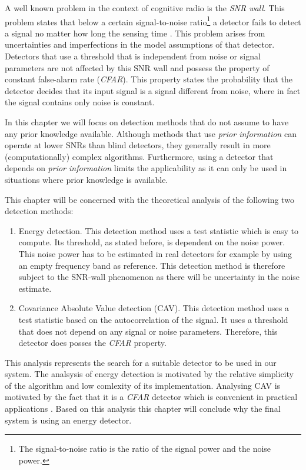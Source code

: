 \documentclass[a4paper, openany, oneside]{memoir}
\begin{document}
A well known problem in the context of cognitive radio is the \emph{SNR wall}. This problem states that below a certain signal-to-noise ratio\footnote{The signal-to-noise ratio is the ratio of the signal power and the noise power.} a detector fails to detect a signal no matter how long the sensing time \cite{sahai2009spectrum}. This problem arises from uncertainties and imperfections in the model assumptions of that detector. Detectors that use a threshold that is independent from noise or signal parameters are not affected by this SNR wall \cite{axell2012spectrum} and possess the property of constant false-alarm rate (\emph{CFAR}). This property states the probability that the detector decides that its input signal is a signal different from noise, where in fact the signal contains only noise is constant. 

In this chapter we will focus on detection methods that do not assume to have any prior knowledge available. Although methods that use \emph{prior information} can operate at lower SNRs than blind detectors, they generally result in more (computationally) complex algorithms. Furthermore, using a detector that depends on \emph{prior information} limits the applicability as it can only be used in situations where prior knowledge is available.

This chapter will be concerned with the theoretical analysis of the following two detection methods:

\begin{enumerate}
	\item Energy detection. This detection method uses a test statistic which is easy to compute. Its threshold, as stated before, is dependent on 
	the noise power. This noise power has to be estimated in real detectors for example by using an empty frequency band as reference. This detection method is therefore subject to the SNR-wall phenomenon as there will be uncertainty in the noise estimate.
	\item Covariance Absolute Value detection (CAV). This detection method uses a test statistic based on the autocorrelation of 
	the signal. It uses a threshold that does not depend on any signal or noise parameters. Therefore, this detector does posses the \emph{CFAR}
	property.
\end{enumerate}

This analysis represents the search for a suitable detector to be used in our system.  The analsysis of energy detection is motivated by the relative simplicity of the algorithm and low comlexity of its implementation. Analysing CAV is motivated by the fact that it is a \emph{CFAR} detector which is convenient in practical applications \cite{axell2012spectrum}.  Based on this analysis this chapter will conclude why the final system is using an energy detector. 
\end{document}
